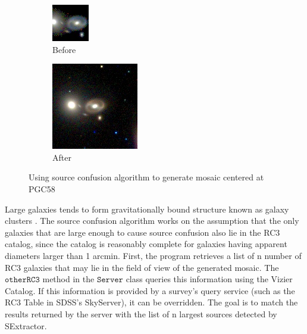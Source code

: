 \documentclass[5p]{elsarticle}
\begin{document}
%
%
%
\begin{figure}
\begin{subfigure}{.3\textwidth}
\centering
  \includegraphics[width=.4\linewidth]{figures/PGC58b4SC}
  \caption{Before}
\end{subfigure}%
\begin{subfigure}{.3\textwidth}
\centering
  \includegraphics[width=.4\linewidth]{figures/PGC58afterSC}
  \caption{After}
\end{subfigure}
\caption{Using source confusion algorithm to generate mosaic centered at PGC58}
\label{fig:SCdemo}
\end{figure}
\indent Large galaxies tends to form gravitationally bound structure known as galaxy clusters . The source confusion algorithm works on the assumption that the only galaxies that are large enough to cause source confusion also lie in the RC3 catalog, since the catalog is reasonably complete for galaxies having apparent diameters larger than 1 arcmin. First, the program retrieves a list of n number of RC3 galaxies that may lie in the field of view of the generated mosaic. The $\texttt{otherRC3}$ method in the $\texttt{Server}$ class queries this information using the Vizier Catalog. If this information is provided by a survey's query service (such as the RC3 Table in SDSS's SkyServer), it can be overridden. The goal is to match the results returned by the server with the list of n largest sources detected by SExtractor. 
\end{document}
